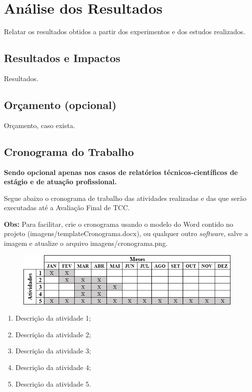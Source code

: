 \chapter{Análise dos Resultados}
\label{cap:04}

Relatar os resultados obtidos a partir dos experimentos e dos estudos realizados. 


\section{Resultados e Impactos}

Resultados.


\section{Orçamento (opcional)}

Orçamento, caso exista.


\section{Cronograma do Trabalho}

\textbf{Sendo opcional apenas nos casos de relatórios técnicos-científicos de estágio e de atuação profissional.}

Segue abaixo o cronograma de trabalho das atividades realizadas e das que serão executadas até a Avaliação Final de TCC.

\textbf{Obs:} Para facilitar, crie o cronograma usando o modelo do Word contido no projeto (imagens/templateCronograma.docx), ou qualquer outro \textit{software}, salve a imagem e atualize o arquivo imagens/cronograma.png.

\FloatBarrier
\begin{figure}[!htbp]
	\centering
	\includegraphics[scale=1]{imagens/cronograma}
\end{figure}
\FloatBarrier

\begin{enumerate}
	\item Descrição da atividade 1;
	\item Descrição da atividade 2;
	\item Descrição da atividade 3;
	\item Descrição da atividade 4;
	\item Descrição da atividade 5.
\end{enumerate}
